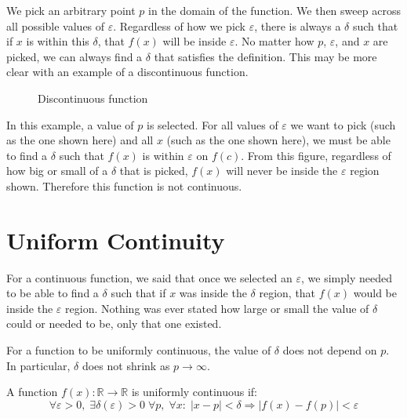 We pick an arbitrary point $p$ in the domain of the function.
We then sweep across all possible values of $\varepsilon$.
Regardless of how we pick $\varepsilon$, there is always a $\delta$ such that if $x$ is within this $\delta$, that $f(x)$ will be inside $\varepsilon$.
No matter how $p$, $\varepsilon$, and $x$ are picked, we can always find a $\delta$ that satisfies the definition.
This may be more clear with an example of a discontinuous function.

\begin{figure}[H]
  \begin{center}
    \caption{Discontinuous function\label{real.label_fig_5}}
  \end{center}
\end{figure}

In this example, a value of $p$ is selected.
For all values of $\varepsilon$ we want to pick (such as the one shown here) and all $x$ (such as the one shown here), we must be able to find a $\delta$ such that $f(x)$ is within $\varepsilon$ on $f(c)$.
From this figure, regardless of how big or small of a $\delta$ that is picked, $f(x)$ will never be inside the $\varepsilon$ region shown.
Therefore this function is not continuous.

\section{Uniform Continuity}

For a continuous function, we said that once we selected an $\varepsilon$, we simply needed to be able to find a $\delta$ such that if $x$ was inside the $\delta$ region, that $f(x)$ would be inside the $\varepsilon$ region.
Nothing was ever stated how large or small the value of $\delta$ could or needed to be, only that one existed.

For a function to be uniformly continuous, the value of $\delta$ does not depend on $p$.
In particular, $\delta$ does not shrink as $p\rightarrow\infty$.

\begin{defn-dan}
  A function $f(x):\mathbb{R}\rightarrow\mathbb{R}$ is uniformly continuous if:
  \begin{equation*}
    \forall\varepsilon>0,\;\exists\delta(\varepsilon)>0\;\forall p,\;\forall x:\;|x-p|<\delta\Rightarrow|f(x)-f(p)|<\varepsilon
  \end{equation*}
\end{defn-dan}

